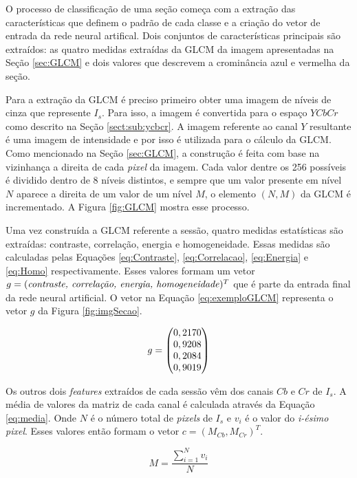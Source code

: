 O processo de classificação de uma seção começa com a extração das características que definem o padrão de cada classe e a criação do vetor de entrada da rede neural artifical. Dois conjuntos de características principais são extraídos: as quatro medidas extraídas da GLCM da imagem apresentadas na Seção \ref{sec:GLCM} e dois valores que descrevem a crominância azul e vermelha da seção.

Para a extração da GLCM é preciso primeiro obter uma imagem de níveis de cinza que represente $I_s$. Para isso, a imagem é convertida para o espaço $YCbCr$ como descrito na Seção \ref{sect:sub:ycbcr}. A imagem referente ao canal $Y$ resultante é uma imagem de intensidade e por isso é utilizada para o cálculo da GLCM. Como mencionado na Seção \ref{sec:GLCM}, a construção é feita com base na vizinhança a direita de cada \textit{pixel} da imagem. Cada valor dentre os 256 possíveis é dividido dentro de 8 níveis distintos, e sempre que um valor presente em nível $N$ aparece a direita de um valor de um nível $M$, o elemento $(N,M)$ da GLCM é incrementado. A Figura \ref{fig:GLCM} mostra esse processo.

Uma vez construída a GLCM referente a sessão, quatro medidas estatísticas são extraídas: contraste, correlação, energia e homogeneidade. Essas medidas são calculadas pelas Equações \ref{eq:Contraste}, \ref{eq:Correlacao}, \ref{eq:Energia} e \ref{eq:Homo} respectivamente. Esses valores formam um vetor $g = (\text{\textit{contraste, correlação, energia, homogeneidade}})^T$ que é parte da entrada final da rede neural artificial. O vetor na Equação \ref{eq:exemploGLCM} representa o vetor $g$ da Figura \ref{fig:imgSecao}.

\begin{equation}
\centering
	g = \begin{pmatrix}
	0,2170\\0,9208\\0,2084\\0,9019
	\end{pmatrix}
\centering
\label{eq:exemploGLCM}
\end{equation}

Os outros dois \textit{features} extraídos de cada sessão vêm dos canais $Cb$ e $Cr$ de $I_s$. A média de valores da matriz de cada canal é calculada através da Equação \ref{eq:media}. Onde $N$ é o número total de \textit{pixels} de $I_s$ e $v_i$ é o valor do \textit{i-ésimo pixel}. Esses valores então formam o vetor $c = (M_{Cb}, M_{Cr})^T$.

\begin{equation}
	M = \frac{\sum_{i=1}^N v_i}{N}
\label{eq:media}
\end{equation}

